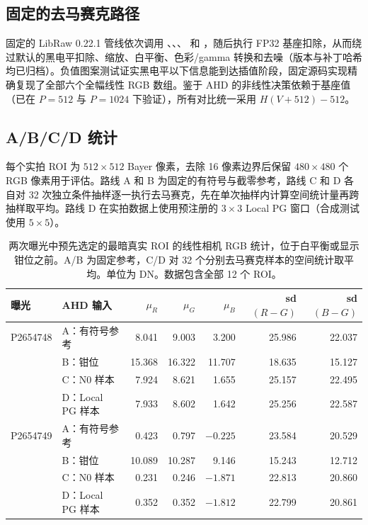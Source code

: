 \documentclass[10pt,twocolumn,journal]{IEEEtran}
\begin{document}
\subsection{固定的去马赛克路径}
固定的 LibRaw 0.22.1 管线依次调用 、、、 和 ，随后执行 FP32 基座扣除，从而绕过默认的黑电平扣除、缩放、白平衡、色彩/gamma 转换和去噪（版本与补丁哈希均已归档）。负值图案测试证实黑电平以下信息能到达插值阶段，固定源码实现精确复现了全部六个全幅线性 RGB 数组。鉴于 AHD 的非线性决策依赖于基座值（已在 $P=512$ 与 $P=1024$ 下验证），所有对比统一采用 $H(V+512)-512$。

\subsection{A/B/C/D 统计}
每个实拍 ROI 为 $512\times512$ Bayer 像素，去除 16 像素边界后保留 $480\times480$ 个 RGB 像素用于评估。路线 A 和 B 为固定的有符号与截零参考，路线 C 和 D 各自对 32 次独立条件抽样逐一执行去马赛克，先在单次抽样内计算空间统计量再跨抽样取平均。路线 D 在实拍数据上使用预注册的 $3\times3$ Local PG 窗口（合成测试使用 $5\times5$）。

\begin{table}[t]
\centering
\caption{两次曝光中预先选定的最暗真实 ROI 的线性相机 RGB 统计，位于白平衡或显示钳位之前。A/B 为固定参考，C/D 对 32 个分别去马赛克样本的空间统计取平均。单位为 DN。数据包含全部 12 个 ROI。}
\label{tab:ahd}
\begin{tabular}{@{}llrrrrr@{}}
\toprule
曝光 & AHD 输入 & $\mu_R$ & $\mu_G$ & $\mu_B$ & sd$(R-G)$ & sd$(B-G)$\\
\midrule
P2654748 & A：有符号参考 & 8.041 & 9.003 & 3.200 & 25.986 & 22.037\\
& B：钳位 & 15.368 & 16.322 & 11.707 & 18.635 & 15.127\\
& C：N0 样本 & 7.924 & 8.621 & 1.655 & 25.157 & 22.495\\
& D：Local PG 样本 & 7.933 & 8.602 & 1.642 & 25.256 & 22.587\\
P2654749 & A：有符号参考 & 0.423 & 0.797 & $-0.225$ & 23.584 & 20.529\\
& B：钳位 & 10.089 & 10.287 & 9.146 & 15.243 & 12.712\\
& C：N0 样本 & 0.231 & 0.246 & $-1.871$ & 22.813 & 20.860\\
& D：Local PG 样本 & 0.352 & 0.352 & $-1.812$ & 22.799 & 20.861\\
\bottomrule
\end{tabular}
\end{table}
\end{document}
